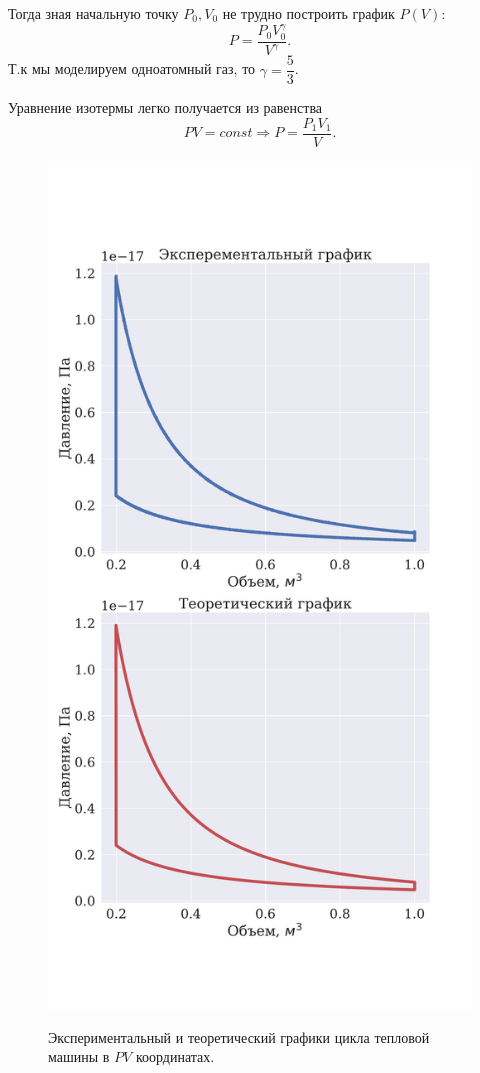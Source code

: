 \documentclass[twoside,twocolumn, 11pt]{article}
\theoremstyle{plain}
\theoremstyle{definition}
\begin{document}
Тогда зная начальную точку $P_0, V_0$ не трудно построить график $P(V)$:
\[P = \dfrac{P_0 V_0^\gamma}{V ^\gamma}. \]
Т.к мы моделируем одноатомный газ, то $\gamma = \dfrac{5}{3}$.

Уравнение изотермы легко получается из равенства
$$PV = const \Rightarrow P = \dfrac{P_1 V_1}{V}.$$
\begin{figure}[!h]
{\includegraphics[width=1\linewidth]{cycle}}
\caption{Экспериментальный и теоретический графики цикла тепловой машины в $PV$ координатах.}
\end{figure}
\end{document}
